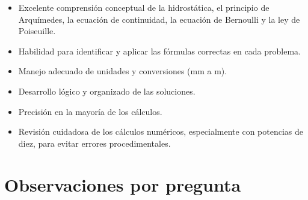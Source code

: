 \documentclass[11pt,a4paper]{article}
\begin{document}
\vspace{4pt}
\begin{minipage}[t]{0.48\linewidth}
  \begin{tcolorbox}[cajaFortaleza, title={Fortalezas}]
\begin{itemize}[leftmargin=1.5em, itemsep=2pt]
  \item Excelente comprensión conceptual de la hidrostática, el principio de Arquímedes, la ecuación de continuidad, la ecuación de Bernoulli y la ley de Poiseuille.
  \item Habilidad para identificar y aplicar las fórmulas correctas en cada problema.
  \item Manejo adecuado de unidades y conversiones (mm a m).
  \item Desarrollo lógico y organizado de las soluciones.
  \item Precisión en la mayoría de los cálculos.
\end{itemize}
  \end{tcolorbox}
\end{minipage}
\hfill
\begin{minipage}[t]{0.48\linewidth}
  \begin{tcolorbox}[cajaMejora, title={Areas de mejora}]
\begin{itemize}[leftmargin=1.5em, itemsep=2pt]
  \item Revisión cuidadosa de los cálculos numéricos, especialmente con potencias de diez, para evitar errores procedimentales.
\end{itemize}
  \end{tcolorbox}
\end{minipage}

\section*{Observaciones por pregunta}
\end{document}
